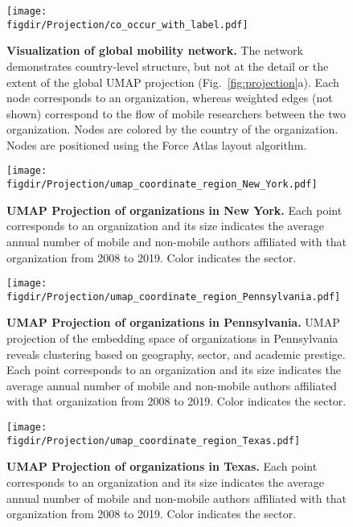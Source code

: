 \documentclass[12pt]{article} %
\def\figdir{../Figs}
\begin{document}
%
%
\begin{figure}[hp!]
	\centering
	\texttt{[image: \\figdir/Projection/co\_occur\_with\_label.pdf]}
	\caption{
		\textbf{Visualization of global mobility network.}
		The network demonstrates country-level structure, but not at the detail or the extent of the global UMAP projection (Fig.~\ref{fig:projection}a).
		Each node corresponds to an organization, whereas  weighted edges (not shown) correspond to the flow of mobile researchers between the two organization.
		Nodes are colored by the country of the organization.
		Nodes are positioned using the Force Atlas layout algorithm.
	}
	\label{fig:supp:network_vis}
\end{figure}



%
%
\begin{figure}[hp!]
	\centering
	\texttt{[image: \\figdir/Projection/umap\_coordinate\_region\_New\_York.pdf]}
	\caption{
		\textbf{UMAP Projection of organizations in New York.}
		Each point corresponds to an organization and its size indicates the average annual number of mobile and non-mobile authors affiliated with that organization from 2008 to 2019.
		Color indicates the sector.
	}
	\label{fig:supp:proj_newyork}
\end{figure}


%
%
\begin{figure}[hp!]
	\centering
	\texttt{[image: \\figdir/Projection/umap\_coordinate\_region\_Pennsylvania.pdf]}
	\caption{
		\textbf{UMAP Projection of organizations in Pennsylvania.}
		UMAP projection of the embedding space of organizations in Pennsylvania reveals clustering based on geography, sector, and academic prestige.
		Each point corresponds to an organization and its size indicates the average annual number of mobile and non-mobile authors affiliated with that organization from 2008 to 2019.
		Color indicates the sector.
	}
	\label{fig:supp:proj_pennsylvania}
\end{figure}


%
%
\begin{figure}[hp!]
	\centering
	\texttt{[image: \\figdir/Projection/umap\_coordinate\_region\_Texas.pdf]}
	\caption{
		\textbf{UMAP Projection of organizations in Texas.}
		Each point corresponds to an organization and its size indicates the average annual number of mobile and non-mobile authors affiliated with that organization from 2008 to 2019.
		Color indicates the sector.
	}
	\label{fig:supp:proj_texas}
\end{figure}
\end{document}
